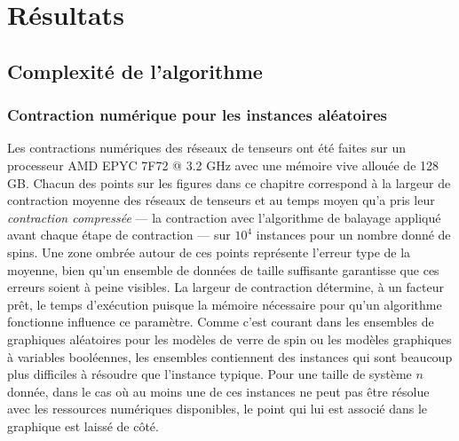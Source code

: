 \begin{comment}
\end{comment}

\part{Résultats}\label{part:results}

\chapter{Complexité de l'algorithme}\label{ch:results}


\section{Contraction numérique pour les instances aléatoires}\label{sec:results-random_instances}
Les contractions numériques des réseaux de tenseurs ont été faites sur un processeur AMD EPYC 7F72 @ 3.2 GHz avec une mémoire vive allouée de 128 GB.
Chacun des points sur les figures dans ce chapitre correspond à la largeur de contraction moyenne des réseaux de tenseurs et au temps moyen qu'a pris leur \emph{contraction compressée} --- la contraction avec l'algorithme de balayage appliqué avant chaque étape de contraction --- sur $10^4$ instances pour un nombre donné de spins.
Une zone ombrée autour de ces points représente l'erreur type de la moyenne, bien qu'un ensemble de données de taille suffisante garantisse que ces erreurs soient à peine visibles.
La largeur de contraction détermine, à un facteur prêt, le temps d'exécution puisque la mémoire nécessaire pour qu'un algorithme fonctionne influence ce paramètre.
Comme c'est courant dans les ensembles de graphiques aléatoires pour les modèles de verre de spin ou les modèles graphiques à variables booléennes, les ensembles contiennent des instances qui sont beaucoup plus difficiles à résoudre que l'instance typique.
Pour une taille de système $n$ donnée, dans le cas où au moins une de ces instances ne peut pas être résolue avec les ressources numériques disponibles, le point qui lui est associé dans le graphique est laissé de côté.

